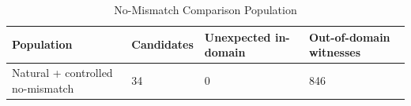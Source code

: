 \begin{table}[t]
\centering
\small
\begin{tabular}{llll}
\toprule
Population & Candidates & Unexpected in-domain & Out-of-domain witnesses \\
\midrule
Natural + controlled no-mismatch & 34 & 0 & 846 \\
\bottomrule
\end{tabular}
\caption{No-Mismatch Comparison Population}
\end{table}
